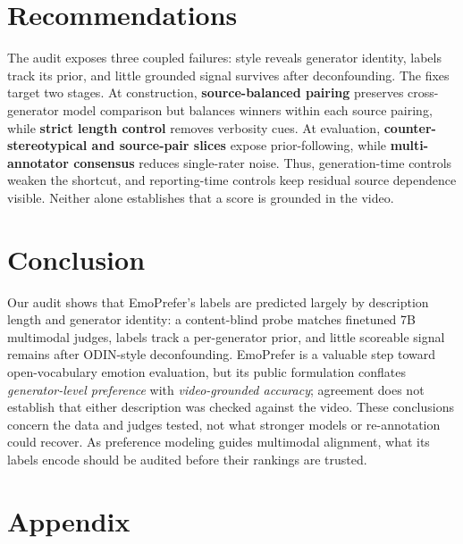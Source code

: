 \documentclass[sigconf,screen]{acmart}
\begin{document}
\section{Recommendations}
The audit exposes three coupled failures: style reveals generator identity, labels track its prior, and little grounded signal survives after deconfounding. The fixes target two stages. At construction, \textbf{source-balanced pairing} preserves cross-generator model comparison but balances winners within each source pairing, while \textbf{strict length control} removes verbosity cues. At evaluation, \textbf{counter-stereotypical and source-pair slices} expose prior-following, while \textbf{multi-annotator consensus} reduces single-rater noise. Thus, generation-time controls weaken the shortcut, and reporting-time controls keep residual source dependence visible. Neither alone establishes that a score is grounded in the video.

\section{Conclusion}
Our audit shows that EmoPrefer's labels are predicted largely by description length and generator identity: a content-blind probe matches finetuned 7B multimodal judges, labels track a per-generator prior, and little scoreable signal remains after ODIN-style deconfounding. EmoPrefer is a valuable step toward open-vocabulary emotion evaluation, but its public formulation conflates \emph{generator-level preference} with \emph{video-grounded accuracy}; agreement does not establish that either description was checked against the video. These conclusions concern the data and judges tested, not what stronger models or re-annotation could recover. As preference modeling guides multimodal alignment, what its labels encode should be audited before their rankings are trusted.


\clearpage



\clearpage
\appendix
\section*{Appendix}
\suppressfloats[t]

\end{document}
